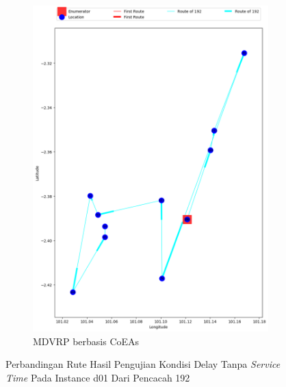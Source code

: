 \begin{figure}[H]
	\centering
	\begin{subfigure}[t]{\textwidth}
		\centering
		\includegraphics[width=\textwidth]{Resources/Images/delayed_1/real_m15_n100_delayed_1_192_coes}
		\caption{MDVRP berbasis CoEAs}
		\label{fig:real_m15_n100_delayed_1_192_coes}
	\end{subfigure}
	\caption{Perbandingan Rute Hasil Pengujian Kondisi Delay Tanpa \textit{Service Time} Pada Instance d01 Dari Pencacah 192}
	\label{fig:real_m15_n100_delayed_1_192}
\end{figure}


